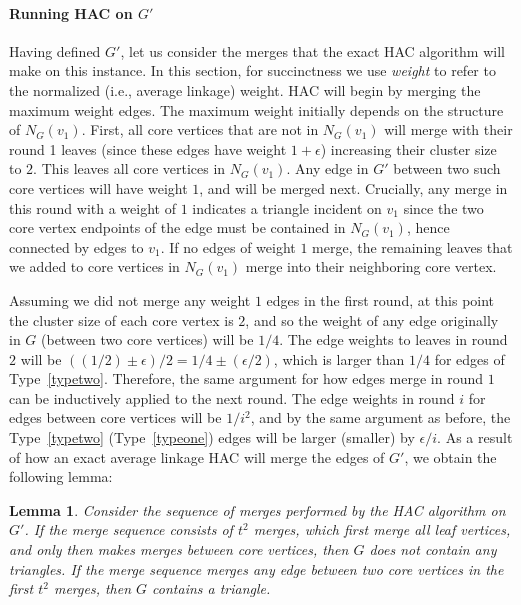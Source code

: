 \documentclass[11pt]{article}
\newtheorem{lemma}{Lemma}
\begin{document}
\paragraph{Running HAC on $G'$}
Having defined $G'$, let us consider the merges that the exact HAC algorithm will make on this instance.
In this section, for succinctness we use {\em weight} to refer to the normalized (i.e., average linkage) weight.
HAC will begin by merging the maximum weight edges.
The maximum weight initially depends on the structure of $N_{G}(v_1)$.
First, all core vertices that are not in $N_{G}(v_1)$ will merge with their round 1 leaves (since these edges have weight $1+\epsilon$) increasing their cluster size to $2$.
This leaves all core vertices in $N_{G}(v_1)$. Any edge in $G'$ between two such core vertices will have weight $1$, and will be merged next.
Crucially, any merge in this round with a weight of $1$ indicates a triangle incident on $v_1$ since the two core vertex endpoints of the edge must be contained in $N_{G}(v_1)$, hence connected by 
edges to $v_1$.
If no edges of weight $1$ merge, the remaining leaves that we added to core vertices in $N_{G}(v_1)$ merge into their neighboring core vertex.

Assuming we did not merge any weight $1$ edges in the first round, at this point the cluster size of each core vertex is $2$, and so the weight of any edge originally in $G$ (between two core vertices) will be $1/4$.
The edge weights to leaves in round $2$ will be $((1/2) \pm \epsilon)/2 = 1/4 \pm (\epsilon / 2)$, which is larger than $1/4$ for edges of Type~\ref{typetwo}.
Therefore, the same argument for how edges merge in round $1$ can be inductively applied to the next round.
The edge weights in round $i$ for edges between core vertices will be $1/i^2$, and by the same argument as before, the Type~\ref{typetwo} (Type~\ref{typeone}) edges will be larger (smaller) by $\epsilon/i$.
As a result of how an exact average linkage HAC will merge the edges of $G'$, we obtain the following lemma:

\begin{lemma}
Consider the sequence of merges performed by the HAC algorithm on $G'$. If the merge sequence consists of $t^2$ merges, which first merge all leaf vertices, and only then makes merges between core vertices, then $G$ does not contain any triangles.
If the merge sequence merges any edge between two core vertices in the first $t^2$ merges, then $G$ contains a triangle.
\end{lemma}
\end{document}

